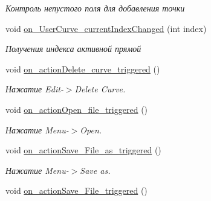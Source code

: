\begin{DoxyCompactItemize}
\begin{DoxyCompactList}\small\item\em Контроль непустого поля для добавления точки \end{DoxyCompactList}\item 
void \hyperlink{class_main_window_abe5494f1256abd53569e546236078ead}{on\+\_\+\+User\+Curve\+\_\+current\+Index\+Changed} (int index)\hypertarget{class_main_window_abe5494f1256abd53569e546236078ead}{}\label{class_main_window_abe5494f1256abd53569e546236078ead}

\begin{DoxyCompactList}\small\item\em Получения индекса активной прямой \end{DoxyCompactList}\item 
void \hyperlink{class_main_window_a6107fba5e2e27b6234ebcf703cf305b1}{on\+\_\+action\+Delete\+\_\+curve\+\_\+triggered} ()\hypertarget{class_main_window_a6107fba5e2e27b6234ebcf703cf305b1}{}\label{class_main_window_a6107fba5e2e27b6234ebcf703cf305b1}

\begin{DoxyCompactList}\small\item\em Нажатие Edit-\/$>$Delete Curve. \end{DoxyCompactList}\item 
void \hyperlink{class_main_window_ab4b13cfa6d7b65dfdea897e7e8425874}{on\+\_\+action\+Open\+\_\+file\+\_\+triggered} ()\hypertarget{class_main_window_ab4b13cfa6d7b65dfdea897e7e8425874}{}\label{class_main_window_ab4b13cfa6d7b65dfdea897e7e8425874}

\begin{DoxyCompactList}\small\item\em Нажатие Menu-\/$>$Open. \end{DoxyCompactList}\item 
void \hyperlink{class_main_window_ad0e823ebb5284bffb3eb92f95d6b0c79}{on\+\_\+action\+Save\+\_\+\+File\+\_\+as\+\_\+triggered} ()\hypertarget{class_main_window_ad0e823ebb5284bffb3eb92f95d6b0c79}{}\label{class_main_window_ad0e823ebb5284bffb3eb92f95d6b0c79}

\begin{DoxyCompactList}\small\item\em Нажатие Menu-\/$>$Save as. \end{DoxyCompactList}\item 
void \hyperlink{class_main_window_ab389ed5a61b95186643e6966ba965d5f}{on\+\_\+action\+Save\+\_\+\+File\+\_\+triggered} ()\hypertarget{class_main_window_ab389ed5a61b95186643e6966ba965d5f}{}\label{class_main_window_ab389ed5a61b95186643e6966ba965d5f}


\end{DoxyCompactItemize}
